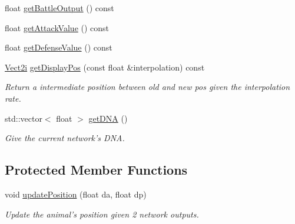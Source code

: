 \begin{DoxyCompactItemize}
\item 
float \hyperlink{class_animal_a49148f18eaebc09edf2bac4d3e44c7ea}{get\-Battle\-Output} () const 
\item 
float \hyperlink{class_animal_a757b167f05eafa17816598d4fcd2f184}{get\-Attack\-Value} () const 
\item 
float \hyperlink{class_animal_a00ec5bc73a90c26bfcf889fa5b85e688}{get\-Defense\-Value} () const 
\item 
\hyperlink{struct_vect2i}{Vect2i} \hyperlink{class_animal_a83a2929c3385a82aefaa689b3330c445}{get\-Display\-Pos} (const float \&interpolation) const 
\begin{DoxyCompactList}\small\item\em Return a intermediate position between old and new pos given the interpolation rate. \end{DoxyCompactList}\item 
std\-::vector$<$ float $>$ \hyperlink{class_animal_a0dcf09dfc831663b028a58a2c841dc06}{get\-D\-N\-A} ()
\begin{DoxyCompactList}\small\item\em Give the current network's D\-N\-A. \end{DoxyCompactList}\end{DoxyCompactItemize}
\subsection*{Protected Member Functions}
\begin{DoxyCompactItemize}
\item 
void \hyperlink{class_animal_a0b6103b76a223ce2eaad73877ff85c73}{update\-Position} (float da, float dp)
\begin{DoxyCompactList}\small\item\em Update the animal's position given 2 network outputs. \end{DoxyCompactList}\end{DoxyCompactItemize}
